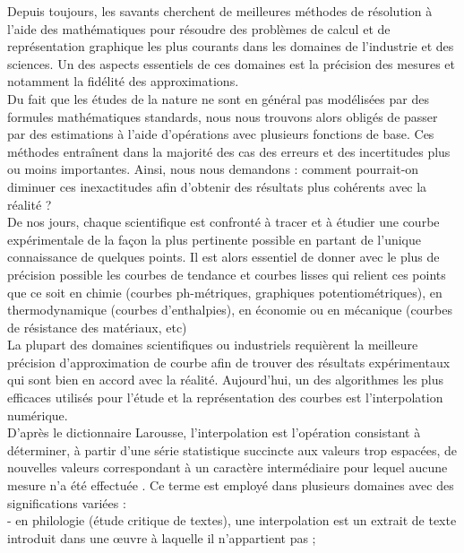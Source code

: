 \documentclass{article}
\begin{document}
	Depuis toujours, les savants cherchent de meilleures m\'{e}thodes de r\'{e}solution \`{a} l'aide des math\'{e}matiques pour r\'{e}soudre des probl\`{e}mes de calcul et de repr\'{e}sentation graphique les plus courants dans les domaines de l'industrie et des sciences. Un des aspects essentiels de ces domaines est la pr\'{e}cision des mesures et notamment la fid\'{e}lit\'{e} des approximations.
\\
\indent
	Du fait que les \'{e}tudes de la nature ne sont en g\'{e}n\'{e}ral pas mod\'{e}lis\'{e}es par des formules math\'{e}matiques standards, nous nous trouvons alors oblig\'{e}s de passer par des estimations \`{a} l'aide d'op\'{e}rations avec plusieurs fonctions de base. Ces m\'{e}thodes entra\^{i}nent dans la majorit\'{e} des cas des erreurs et des incertitudes plus ou moins importantes. Ainsi, nous nous demandons : comment pourrait-on diminuer ces inexactitudes afin d'obtenir des r\'{e}sultats plus coh\'{e}rents avec la r\'{e}alit\'{e} ?
\\
\indent
	De nos jours, chaque scientifique est confront\'{e} \`{a} tracer et \`{a} \'{e}tudier une courbe exp\'{e}rimentale de la 
fa\c con la plus pertinente possible en partant de l'unique connaissance de quelques points. Il est alors essentiel de donner avec le plus de pr\'{e}cision possible les courbes de tendance et courbes lisses qui relient ces points que ce soit en chimie (courbes ph-m\'{e}triques, graphiques potentiom\'{e}triques), en thermodynamique (courbes d'enthalpies), en \'{e}conomie ou en m\'{e}canique (courbes de r\'{e}sistance des mat\'{e}riaux, etc)
\\
\indent
	La plupart des domaines scientifiques ou industriels requi\`{e}rent la meilleure pr\'{e}cision d'approximation de courbe afin de trouver des r\'{e}sultats exp\'{e}rimentaux qui sont bien en accord avec la r\'{e}alit\'{e}. Aujourd'hui, un des algorithmes les plus efficaces utilis\'{e}s pour l'\'{e}tude et la repr\'{e}sentation des courbes est l'interpolation num\'{e}rique.
\\
\indent
	D'apr\`{e}s le dictionnaire Larousse, l'interpolation est \guillemotleft l'op\'{e}ration consistant \`{a} d\'{e}terminer, \`{a} partir d'une s\'{e}rie statistique succincte aux valeurs trop espac\'{e}es, de nouvelles valeurs correspondant \`{a} un caract\`{e}re interm\'{e}diaire pour lequel aucune mesure n'a \'{e}t\'{e} effectu\'{e}e \guillemotright. Ce terme est employ\'{e} dans plusieurs domaines avec des significations vari\'{e}es :
\\
- en philologie (\'{e}tude critique de textes), une interpolation est un extrait de texte introduit dans une \oe{}uvre \`{a} laquelle il n'appartient pas ;
\end{document}
